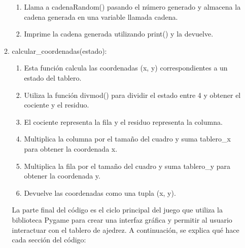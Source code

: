 \begin{enumerate}
\begin{enumerate}
\begin{enumerate}
        \item Llama a cadenaRandom() pasando el número generado y almacena la cadena generada en una variable llamada cadena.\newline
        \item Imprime la cadena generada utilizando print() y la devuelve.\newline
    \end{enumerate}
    \item calcular\_coordenadas(estado):\newline
    \begin{enumerate}
        \item Esta función calcula las coordenadas (x, y) correspondientes a un estado del tablero.\newline
        \item Utiliza la función divmod() para dividir el estado entre 4 y obtener el cociente y el residuo.\newline
        \item El cociente representa la fila y el residuo representa la columna.\newline
        \item Multiplica la columna por el tamaño del cuadro y suma tablero\_x para obtener la coordenada x.\newline
        \item Multiplica la fila por el tamaño del cuadro y suma tablero\_y para obtener la coordenada y.\newline
        \item Devuelve las coordenadas como una tupla (x, y).\newline
    \end{enumerate}


      La parte final del código es el ciclo principal del juego que utiliza la biblioteca Pygame para crear una interfaz gráfica y permitir al usuario interactuar con el tablero de ajedrez. A continuación, se explica qué hace cada sección del código:\newline
  

\end{enumerate}
\end{enumerate}
